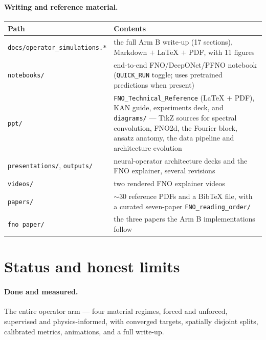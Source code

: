 \documentclass[11pt,a4paper]{article}
\begin{document}
\paragraph{Writing and reference material.}
\begin{center}
\small
\begin{tabular}{@{}>{\raggedright\arraybackslash}p{5.4cm}>{\raggedright\arraybackslash}p{9.7cm}@{}}
\toprule
\textbf{Path} & \textbf{Contents}\\
\midrule
\texttt{docs/operator\_simulations.*} & the full Arm B write-up (17 sections), Markdown $+$ \LaTeX{} $+$ PDF, with 11 figures\\
\texttt{notebooks/}      & end-to-end FNO/DeepONet/PFNO notebook (\texttt{QUICK\_RUN} toggle; uses pretrained predictions when present)\\
\texttt{ppt/}            & \texttt{FNO\_Technical\_Reference} (\LaTeX{} $+$ PDF), KAN guide, experiments deck, and \texttt{diagrams/} --- TikZ sources for spectral convolution, FNO2d, the Fourier block, ansatz anatomy, the data pipeline and architecture evolution\\
\texttt{presentations/}, \texttt{outputs/} & neural-operator architecture decks and the FNO explainer, several revisions\\
\texttt{videos/}         & two rendered FNO explainer videos\\
\texttt{papers/}         & $\sim$30 reference PDFs and a BibTeX file, with a curated seven-paper \texttt{FNO\_reading\_order/}\\
\texttt{fno paper/}      & the three papers the Arm B implementations follow\\
\bottomrule
\end{tabular}
\end{center}

\section{Status and honest limits}

\paragraph{Done and measured.} The entire operator arm --- four material
regimes, forced and unforced, supervised and physics-informed, with converged
targets, spatially disjoint splits, calibrated metrics, animations, and a full
write-up.
\end{document}
